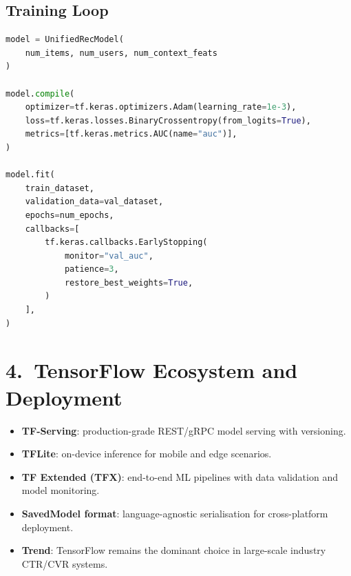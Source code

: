 \documentclass[12pt]{article}
\begin{document}
\subsection*{Training Loop}
\begin{lstlisting}[language=Python]
model = UnifiedRecModel(
    num_items, num_users, num_context_feats
)

model.compile(
    optimizer=tf.keras.optimizers.Adam(learning_rate=1e-3),
    loss=tf.keras.losses.BinaryCrossentropy(from_logits=True),
    metrics=[tf.keras.metrics.AUC(name="auc")],
)

model.fit(
    train_dataset,
    validation_data=val_dataset,
    epochs=num_epochs,
    callbacks=[
        tf.keras.callbacks.EarlyStopping(
            monitor="val_auc",
            patience=3,
            restore_best_weights=True,
        )
    ],
)
\end{lstlisting}

\section{4.\ TensorFlow Ecosystem and Deployment}
\begin{itemize}
    \item \textbf{TF-Serving}: production-grade REST/gRPC model serving with versioning.
    \item \textbf{TFLite}: on-device inference for mobile and edge scenarios.
    \item \textbf{TF Extended (TFX)}: end-to-end ML pipelines with data validation and model monitoring.
    \item \textbf{SavedModel format}: language-agnostic serialisation for cross-platform deployment.
    \item \textbf{Trend}: TensorFlow remains the dominant choice in large-scale industry CTR/CVR systems.
\end{itemize}
\end{document}
